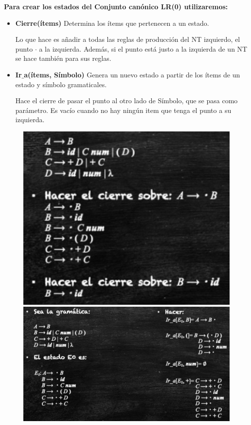 \documentclass[12pt, twoside, openright]{report} %
\begin{document}
\textbf{Para crear los estados del Conjunto canónico LR(0) utilizaremos:}
\begin{itemize}
  \item \textbf{Cierre(ítems)} Determina los ítems que pertenecen a un estado. 
  
  Lo que hace es añadir a todas las reglas de producción del NT izquierdo, el punto $\cdot$ a la izquierda. Además, si el punto está justo a la izquierda de un NT se hace también para sus reglas. 
  
  \item \textbf{Ir$\_$a(ítems, Símbolo)} Genera un nuevo estado a partir de los ítems de un estado y símbolo gramaticales.
  
  Hace el cierre de pasar el punto al otro lado de Símbolo, que se pasa como parámetro. Es vacío cuando no hay ningún item que tenga el punto a su izquierda.
\end{itemize}
\begin{figure}[H]
  {\includegraphics[scale=.4]{2021-03-26 19_10_20-ASintactico.pdf - Foxit Reader.png}
  \includegraphics[scale=.4]{2021-03-26 19_14_19-ASintactico.pdf - Foxit Reader.png}}
\end{figure}
\end{document}
